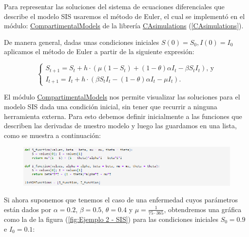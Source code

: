 Para representar las soluciones del sistema de ecuaciones diferenciales que describe el modelo SIS usaremos el método de Euler, el cual se implementó en el módulo:
\href{https://grupo-de-simulacion-con-automatas.github.io/CAsimulations-Modelacion-de-dinamicas-topologicas-en-la-propagacion-de-una-enfermedad-usando-CA/#:~:text=CellSpaceConfiguration-,CompartmentalModelsInEDOS,-Con\%20este\%20m\%C3\%B3dulo}{\underline{CompartimentalModels}} de la librería \href{https://github.com/Grupo-de-simulacion-con-automatas/Prediccion-del-comportamiento-de-una-enfermedad-simulada-en-AC-con-un-algoritmo-en-RN/tree/master/Codigo/CAsimulation}{CAsimulations} (\ref{CAsimulations}).

De manera general, dadas unas condiciones iniciales $S(0)=S_0,I(0)=I_0$ aplicamos el método de Euler a partir de la siguiente expresión:

$$\left\{\begin{array}{l}
S_{t+1} = S_t + h\cdot(\mu(1 - S_t) + (1 - \theta)\alpha I_t - \beta S_t I_t )\text{, y} \\
I_{t+1} = I_t + h\cdot(\beta S_t I_t - (1 - \theta)\alpha I_t - \mu I_t).
\end{array}\right.$$

El módulo \href{https://grupo-de-simulacion-con-automatas.github.io/CAsimulations-Modelacion-de-dinamicas-topologicas-en-la-propagacion-de-una-enfermedad-usando-CA/#:~:text=CellSpaceConfiguration-,CompartmentalModelsInEDOS,-Con\%20este\%20m\%C3\%B3dulo}{\underline{CompartimentalModels}} nos permite visualizar las soluciones para el modelo SIS dada una condición inicial, sin tener que recurrir a ninguna herramienta externa. Para esto debemos definir inicialmente a las funciones que describen las derivadas de nuestro modelo y luego las guardamos en una lista, como se muestra a continuación:

\begin{figure}[h]
    \includegraphics[width=1\textwidth]{Imagenes/compartimentalModels1.png}
\end{figure}

Si ahora suponemos que tenemos el caso de una enfermedad cuyos parámetros están dados por $\alpha=0.2$, $\beta=0.5$, $\theta=0.4$ y $\mu=\frac{1}{75\cdot365}$, obtendremos una gráfica como la de la figura (\ref{fig:Ejemplo 2 - SIS}) para las condiciones iniciales $S_0=0.9$ e $I_0=0.1$:

